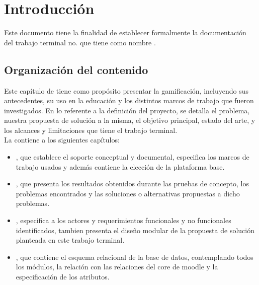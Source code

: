\chapter{Introducción}
\label{ch:introduccion}

Este documento tiene la finalidad de establecer formalmente la documentación del trabajo terminal no. {\numeroTT} que tiene como nombre {\bf\tituloTT}.

\section{Organización del contenido}

Este capítulo de  tiene como propósito presentar la gamificación, incluyendo sus antecedentes, su uso en la educación y los distintos marcos de trabajo que fueron investigados. En lo referente a la definición del proyecto, se detalla el problema, nuestra propuesta de solución a la misma, el objetivo principal, estado del arte, y los alcances y limitaciones que tiene el trabajo terminal.\\

\noindent La  contiene a los siguientes capítulos:%

    \begin{itemize}
        \item {}, que establece el soporte conceptual y documental, 
        especifica los marcos de trabajo usados y además contiene la elección de la 
        plataforma base.
        
        \item {}, que presenta los resultados obtenidos durante 
        las pruebas de concepto, los problemas encontrados y las soluciones o alternativas 
        propuestas a dicho problemas.
    
        \item {}, especifica a los actores y requerimientos funcionales
        y no funcionales identificados, tambien presenta el diseño modular de la propuesta
        de solución planteada en este trabajo terminal.
        
        \item {}, que contiene el esquema relacional de la base de 
        datos, contemplando todos los módulos, la relación con las relaciones del core de 
        moodle y la especificación de los atributos.
    \end{itemize}

